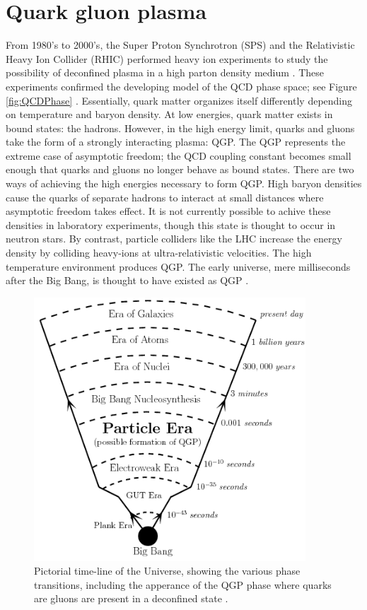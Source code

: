 \section{Quark gluon plasma}

From 1980's to 2000's, the Super Proton Synchrotron (SPS) and the Relativistic Heavy Ion Collider (RHIC) performed heavy ion experiments to study the possibility of deconfined plasma in a high parton density medium \cite{spsHI,ags2rhic,etaOvSinit}. These experiments confirmed the developing model of the QCD phase space; see Figure \ref{fig:QCDPhase} \cite{Bhalerao:1695331}. Essentially, quark matter organizes itself differently depending on temperature and baryon density. At low energies, quark matter exists in bound states: the hadrons. However, in the high energy limit, quarks and gluons take the form of a strongly interacting plasma: QGP. The QGP represents the extreme case of asymptotic freedom; the QCD coupling constant becomes small enough that quarks and gluons no longer behave as bound states. There are two ways of achieving the high energies necessary to form QGP. High baryon densities cause the quarks of separate hadrons to interact at small distances where asymptotic freedom takes effect. It is not currently possible to achive these densities in laboratory experiments, though this state is thought to occur in neutron stars. By contrast, particle colliders like the LHC increase the energy density by colliding heavy-ions at ultra-relativistic velocities. The high temperature environment produces QGP. The early universe, mere milliseconds after the Big Bang, is thought to have existed as QGP \cite{Hands:2001ve}.


\begin{figure}[h!]
\begin{centering}
\includegraphics[width=4in]{Chapter1/importfigs/fig_bb_timeline.png}
\par\end{centering}
\caption{Pictorial time-line of the Universe, showing the various phase transitions, including the apperance of the QGP phase where quarks are gluons are present in a deconfined state \cite{Bandyopadhyay:2017wip}. \label{fig:history}}
\end{figure}

